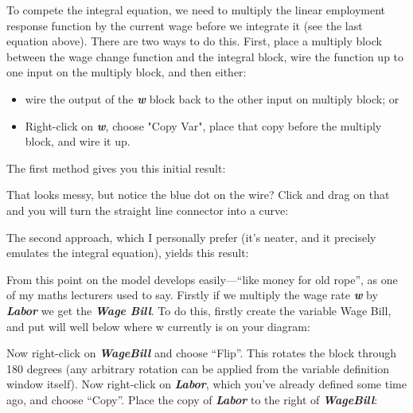\begin{center}
\end{center}

To compete the integral equation, we need to multiply the linear
employment response function by the current wage before we integrate
it (see the last equation above). There are two ways to do
this. First, place a multiply block between the wage change function
and the integral block, wire the function up to one input on the
multiply block, and then either:

\begin{itemize}
\item wire the output of the {\bf\em w} block back to the other input
on multiply block; or
\item Right-click on {\bf\em w}, choose "Copy Var", place that copy
before the multiply block, and wire it up.
\end{itemize}

The first method gives you this initial result:


That looks messy, but notice the blue dot on the wire? Click and drag
on that and you will turn the straight line connector into a curve: 


The second approach, which I personally prefer (it's neater, and it
precisely emulates the integral equation), yields this result: 


From this point on the model develops easily---``like money for old
rope'', as one of my maths lecturers used to say. Firstly if we
multiply the wage rate {\bf\em w} by {\bf\em Labor} we get the {\em\bf
Wage Bill}. To do this,
firstly create the variable Wage Bill, and put will well below where w
currently is on your diagram: 


Now right-click on {\bf\em WageBill} and choose ``Flip''. This rotates
the block through 180 degrees (any arbitrary rotation can be applied
from the variable definition window itself). Now right-click on
{\bf\em Labor}, which you've already defined some time ago, and choose
``Copy''. Place the copy of {\bf\em Labor} to the right of {\bf\em
WageBill}:

\begin{center}
\end{center}

